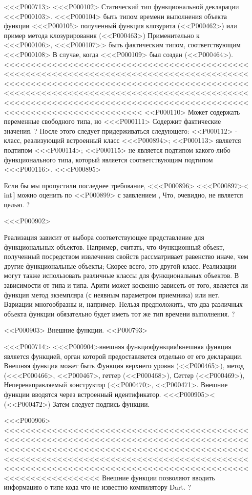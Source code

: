 {{<<<P000713>%
<<<P000102> Статический тип функциональной декларации <<<P000103>.
<<<P000104> быть типом времени выполнения объекта функции <<<P000105> полученный
функция клозурита
(<<P000462>)
или пример метода клозурирования
(<<P000463>)
Применительно к <<<P000106>,
<<<P000107>> быть фактическим типом, соответствующим <<<P000108>
В случае, когда <<<P000109> был создан
(<<P000464>).
<<<<<<<<<<<<<<<<<<<<<<<<<<<<<<<<<<<<<<<<<<<<<<<<<<<<<<<<<<<<<<<<<<<<<<<<<<<<<<<<<<<<<<<<<<<<<<<<<<<<<<<<<<<<<<<<<<<<<<<<<<<<<<<<<<<<<<<<<<<<<<<<<<<<<<<<<<<<<<<<<<<<<<<<<<<<<<<<<<<<<<<<<<<<<<<<<<<<<<<<<<<<<<<<<<<<<<<<<<<<<<<<<<<<<<<<<<<<<<<<<<<<<<<<<<<<<<<<
<<P000110> Может содержать переменные свободного типа, но <<<P000111> Содержит фактические значения.%
?
После этого следует придерживаться следующего:
<<P000112> - класс, реализующий встроенный класс <<<P000894>;
<<P000113> является подтипом <<<P000114>;
<<P000115> не является подтипом какого-либо функционального типа, который является соответствующим подтипом <<<P000116>.
<<<P000895>{%
Если бы мы пропустили последнее требование,
<<<P000896> <<<P000897>< int\,\FUNCTION[int]]
можно оценить по <<P000899> с заявлением
,
Что, очевидно, не является целью.%
?

<<<P000902>{%
Реализация зависит от выбора
соответствующее представление для функциональных объектов.
Например, считать, что
Функционный объект, полученный посредством извлечения свойств
рассматривает равенство иначе, чем другие функциональные объекты;
Скорее всего, это другой класс.
Реализации могут также использовать различные классы для функциональных объектов.
В зависимости от типа и типа.
Арити может косвенно зависеть от того, является ли функция
метод экземпляра (с неявным параметром приемника) или нет.
Вариации многообразны и, например,
Нельзя предположить, что два различных объекта функции
обязательно будет иметь тот же тип времени выполнения.%
?


<<P000903> Внешние функции.
<<P000793>

<<<P000714>%
<<<P000904>{внешняя функция}{функция!внешняя функция}
является функцией, орган которой предоставляется отдельно от его декларации.
Внешняя функция может быть
Функция верхнего уровня (<<P000465>),
метод (<<<P000466>, <<P000467>,
геттер (<<P000468>),
Сеттер (<<P000469>),
Неперенаправляемый конструктор
(<<P000470>, <<P000471>.
Внешние функции вводятся через встроенный идентификатор. <<<P000905><
(<<P000472>)
Затем следует подпись функции.

<<<P000906><<<<<<<<<<<<<<<<<<<<<<<<<<<<<<<<<<<<<<<<<<<<<<<<<<<<<<<<<<<<<<<<<<<<<<<<<<<<<<<<<<<<<<<<<<<<<<<<<<<<<<<<<<<<<<<<<<<<<<<<<<<<<<<<<<<<<<<<<<<<<<<<<<<<<<<<<<<<<<<<<<<<<<<<<<<<<<<<<<<<<<<<<<<<<<<<<<<<<<<<<<<<<<<<<<<<<<<<<<<<<<<<<<<<<<<<<<<<<<<<<<<<<<<<
Внешние функции позволяют вводить информацию о типе кода
что не известно компилятору Dart.%
?

}}}}
